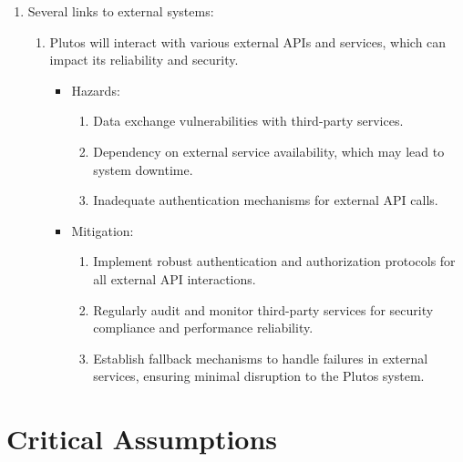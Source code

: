 \documentclass{article}
\begin{document}
\begin{enumerate}
    \item Several links to external systems:
    \begin{enumerate}
        \item Plutos will interact with various external APIs and services, which can 
        impact its reliability and security. 
		\begin{itemize}
			\item Hazards:
				\begin{enumerate}
					\item Data exchange vulnerabilities with third-party services.
                    \item Dependency on external service availability, which may lead to system downtime.
                    \item Inadequate authentication mechanisms for external API calls.
				\end{enumerate}
			\item Mitigation:
				\begin{enumerate}
					\item Implement robust authentication and authorization protocols for all external API interactions.
                    \item Regularly audit and monitor third-party services for security compliance and performance reliability.
                    \item Establish fallback mechanisms to handle failures in external services, ensuring minimal disruption 
                    to the Plutos system.
                \end{enumerate}
        \end{itemize}
    \end{enumerate}
\end{enumerate}


\section{Critical Assumptions}
\end{document}

